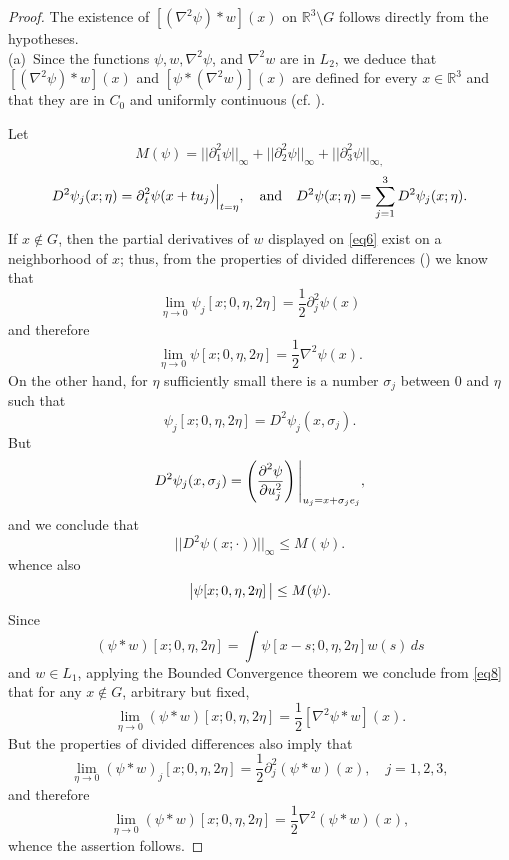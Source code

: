 \documentclass[english, reqno]{amsart}
\newcommand{\del}{\mbox{$\partial$}}
\newcommand{\half}{\mbox{$\frac{1}{2}$}}
\newcommand{\IR}{\text{${\mathbb{R}}$}}
\begin{document}
\begin{proof}
The existence of $[(\nabla^2\psi )\ast w](x)$ on $\IR^3 \setminus G$ follows directly from the hypotheses.\\
(a)\ Since the functions $\psi, w, \nabla^2\psi$, and $\nabla^2w$ are in $L_2$, we deduce that  $[(\nabla^2\psi )\ast w](x)$ and $ [\psi \ast (\nabla^2 w)](x)$ are defined for every $x \in \IR^3$ and that they are in $C_0$ and uniformly continuous (cf. \cite[Theorem 8.8]{Fo1}).

Let 
\[
M(\psi)=||\del_1^2\psi||_{\infty}+||\del_2^2\psi||_{\infty}+||\del_3^2\psi||_{\infty,}
\]
\[
D^2\psi_j(x;\eta)=\del^2_t \psi(x+t u_j) \Big{|}_{t=\eta}, \quad \text{and} \quad D^2\psi(x;\eta)= \sum_{j=1}^3 D^2\psi_j(x;\eta).
\]
If $x \notin G$, then the partial derivatives of $w$ displayed on \eqref{eq6} exist on a neighborhood of $x$; thus, from
the properties of divided differences (\cite{SB}) we know that 
\[
\lim_{\eta \rightarrow 0}\psi_{j}[x;0, \eta, 2\eta]=\half \del_j^2\psi(x) 
\]
and therefore
\begin{equation} \label{eq8}
\lim_{\eta \rightarrow 0} \psi[x;0, \eta, 2 \eta]=\half \nabla^2\psi(x).
\end{equation}
On the other hand, for $\eta$ sufficiently small there is a number $\sigma_j$ between 0 and $\eta$ such that
\[
\psi_j[x;0, \eta, 2 \eta] = D^2\psi_j(x,\sigma_j).
\]
But
\[
D^2\psi_j(x, \sigma_j)= \left ( \frac {\del^2\psi}{\del u_j^2}\right ) \Bigg{| }_{u_j=x + \sigma_j e_j},
\]
and we conclude that
\[
||D^2\psi(x;\cdot))||_{\infty} \le M(\psi).
\]
whence also
\[
\big{|} \psi[x; 0, \eta, 2 \eta] \,\big{|}  \le M(\psi).
\]
Since
\[
(\psi\ast w)[x; 0, \eta, 2 \eta]= \int \psi[x-s; 0, \eta, 2 \eta] w(s)\,ds
\]
and $w\in L_1$, applying the Bounded Convergence theorem we conclude from \eqref{eq8} that for any $x \notin G$, arbitrary but fixed,
\[
\lim_{\eta \rightarrow 0}(\psi\ast w)[x; 0, \eta, 2 \eta]= \half [\nabla^2\psi\ast w](x).
\]
But the properties of divided differences also imply that
\[
\lim_{\eta \rightarrow 0}(\psi\ast w)_{j}[x;0, \eta, 2\eta]=\half \del^2_j(\psi\ast w)(x), \quad j=1, 2 ,3,
\]
and therefore
\begin{equation} \label{eq9}
\lim_{\eta \rightarrow 0} (\psi\ast w)[x;0, \eta, 2 \eta]=\half \nabla^2(\psi\ast w)(x),
\end{equation}
whence the assertion follows.


\end{proof}
\end{document}
